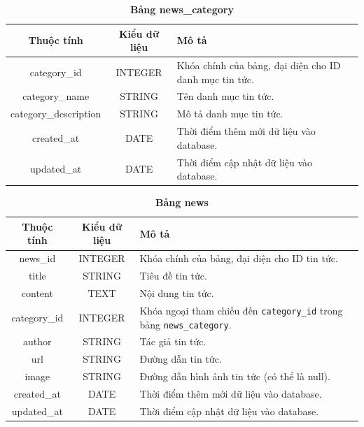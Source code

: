 \begin{table}[H]
  \caption{\bfseries \fontsize{12pt}{0pt}\selectfont Bảng news\_category}
  \centering
  \begin{tabularx}{0.9\textwidth}{|c|c|X|}
    \hline
    \textbf{Thuộc tính} & \textbf{Kiểu dữ liệu} & \textbf{Mô tả} \\
    \hline
    category\_id & INTEGER & Khóa chính của bảng, đại diện cho ID danh mục tin tức. \\
    \hline
    category\_name & STRING & Tên danh mục tin tức. \\
    \hline
    category\_description & STRING & Mô tả danh mục tin tức. \\
    \hline
    created\_at & DATE & Thời điểm thêm mới dữ liệu vào database. \\
    \hline
    updated\_at & DATE & Thời điểm cập nhật dữ liệu vào database. \\
    \hline
  \end{tabularx}
\end{table}

\begin{table}[H]
  \caption{\bfseries \fontsize{12pt}{0pt}\selectfont Bảng news}
  \centering
  \begin{tabularx}{0.9\textwidth}{|c|c|X|}
    \hline
    \textbf{Thuộc tính} & \textbf{Kiểu dữ liệu} & \textbf{Mô tả} \\
    \hline
    news\_id & INTEGER & Khóa chính của bảng, đại diện cho ID tin tức. \\
    \hline
    title & STRING & Tiêu đề tin tức. \\
    \hline
    content & TEXT & Nội dung tin tức. \\
    \hline
    category\_id & INTEGER & Khóa ngoại tham chiếu đến \texttt{category\_id} trong bảng \texttt{news\_category}. \\
    \hline
    author & STRING & Tác giả tin tức. \\
    \hline
    url & STRING & Đường dẫn tin tức. \\
    \hline
    image & STRING & Đường dẫn hình ảnh tin tức (có thể là null). \\
    \hline
    created\_at & DATE & Thời điểm thêm mới dữ liệu vào database. \\
    \hline
    updated\_at & DATE & Thời điểm cập nhật dữ liệu vào database. \\
    \hline
  \end{tabularx}
\end{table}

